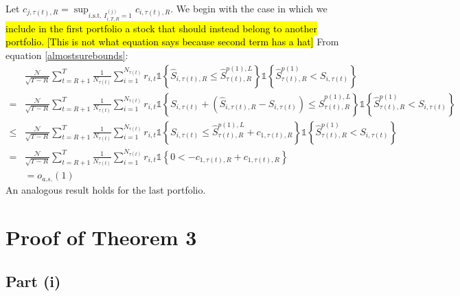 Let $c_{j,\tau(t) ,R}=\sup_{i\text{.s.t. }I_{i,T,R}^{(j)}=1}c_{i,\tau(t) ,R}$. We begin with the case in which we \hl{include in the first portfolio a stock that should instead belong to another portfolio. [This is not what equation says because second term has a hat]} From equation \eqref{almostsurebounds}:
\begin{align*}
&\frac{\mathcal{N}}{\sqrt{T-R}}\sum_{t=R+1}^{T}\frac{1}{N_{\tau(t) }}\sum_{i=1}^{N_{\tau(t) }}r_{i,t} \mathds{1} \left\{ \widehat{S}_{i,\tau(t) ,R}\leq \widehat{S}_{\tau(t),R}^{p(1),L}\right\} \mathds{1} \left\{ \widehat{S}_{\tau(t),R}^{p(1)} < S_{i,\tau(t) } \right\}  \\
=&\frac{\mathcal{N}}{\sqrt{T-R}}\sum_{t=R+1}^{T}\frac{1}{N_{\tau(t) }}\sum_{i=1}^{N_{\tau(t) }}r_{i,t} \mathds{1} \left\{ S_{i,\tau(t) }+\left( \widehat{S}_{i,\tau(t),R}-S_{i,\tau(t) }\right) \leq \widehat{S}_{\tau(t) ,R}^{p(1),L}\right\} \mathds{1} \left\{ \widehat{S}_{\tau(t) ,R}^{p(1)} < S_{i,\tau(t) } \right\}  \\
\leq &\frac{\mathcal{N}}{\sqrt{T-R}}\sum_{t=R+1}^{T}\frac{1}{N_{\tau(t) }}\sum_{i=1}^{N_{\tau(t) }}r_{i,t} \mathds{1} \left\{ S_{i,\tau(t) }\leq \widehat{S}_{\tau(t),R}^{p(1),L}+c_{1,\tau(t),R} \right\} \mathds{1} \left\{ \widehat{S}_{\tau(t) ,R}^{p(1)} < S_{i,\tau(t) } \right\}  \\
= &\frac{\mathcal{N}}{\sqrt{T-R}}\sum_{t=R+1}^{T}\frac{1}{N_{\tau(t) }}\sum_{i=1}^{N_{\tau(t) }}r_{i,t} \mathds{1} \left\{ 0 < -c_{1,\tau(t),R} + c_{1,\tau(t),R} \right\}  \\
&= o_{a.s.}(1)
\end{align*} 
An analogous result holds for the last portfolio.




\section{Proof of Theorem 3}
\label{Proof of th:feasible}

\subsection{Part (i)}

